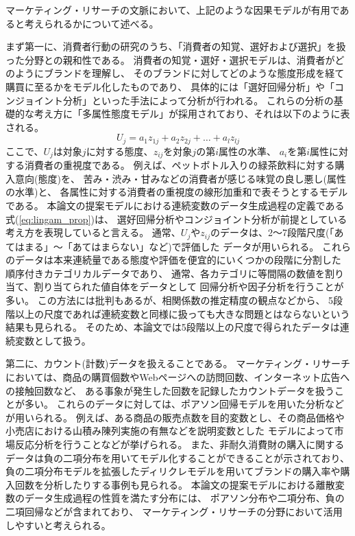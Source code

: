 マーケティング・リサーチの文脈において、上記のような因果モデルが有用であると考えられるかについて述べる。

まず第一に、消費者行動の研究のうち、「消費者の知覚、選好および選択」を扱った分野との親和性である。
消費者の知覚・選好・選択モデルは、消費者がどのようにブランドを理解し、
そのブランドに対してどのような態度形成を経て購買に至るかをモデル化したものであり、
具体的には「選好回帰分析」や「コンジョイント分析」といった手法によって分析が行われる\cite{1987-vg}。
これらの分析の基礎的な考え方に「多属性態度モデル」が採用されており、それは以下のように表される。
\begin{equation}
  U_j = a_1 z_{1j} + a_2 z_{2j} + \dots + a_l z_{lj}
\end{equation}
ここで、$U_j$は対象$j$に対する態度、$z_{ij}$を対象$j$の第$i$属性の水準、
$a_i$を第$i$属性に対する消費者の重視度である。
例えば、ペットボトル入りの緑茶飲料に対する購入意向(態度)を、
苦み・渋み・甘みなどの消費者が感じる味覚の良し悪し(属性の水準)と、
各属性に対する消費者の重視度の線形加重和で表そうとするモデルである。
本論文の提案モデルにおける連続変数のデータ生成過程の定義である式(\ref{eq:lingam_prop})は、
選好回帰分析やコンジョイント分析が前提としている考え方を表現していると言える。
通常、$U_j$や$z_{ij}$のデータは、2〜7段階尺度(「あてはまる」〜「あてはまらない」など)で評価した
データが用いられる\cite{1987-vg}\cite{2018-ci}。
これらのデータは本来連続量である態度や評価を便宜的にいくつかの段階に分割した
順序付きカテゴリカルデータであり、
通常、各カテゴリに等間隔の数値を割り当て、割り当てられた値自体をデータとして
回帰分析や因子分析を行うことが多い。
この方法には批判もあるが、相関係数の推定精度の観点などから、
5段階以上の尺度であれば連続変数と同様に扱っても大きな問題とはならないという結果も見られる\cite{1996-bs}。
そのため、本論文では5段階以上の尺度で得られたデータは連続変数として扱う。

第二に、カウント(計数)データを扱えることである。
マーケティング・リサーチにおいては、商品の購買個数やWebページへの訪問回数、インターネット広告への接触回数など、
ある事象が発生した回数を記録したカウントデータを扱うことが多い。
これらのデータに対しては、ポアソン回帰モデルを用いた分析などが用いられる。
例えば、ある商品の販売点数を目的変数とし、その商品価格や小売店における山積み陳列実施の有無などを説明変数とした
モデルによって市場反応分析を行うことなどが挙げられる\cite{2015-pb}。
また、非耐久消費財の購入に関するデータは負の二項分布を用いてモデル化することができることが示されており\cite{Ehrenberg1959-ei}、
負の二項分布モデルを拡張したディリクレモデルを用いてブランドの購入率や購入回数を分析したりする事例も見られる\cite{2016-io}。
本論文の提案モデルにおける離散変数のデータ生成過程の性質を満たす分布には、
ポアソン分布や二項分布、負の二項回帰などが含まれており、
マーケティング・リサーチの分野において活用しやすいと考えられる。
